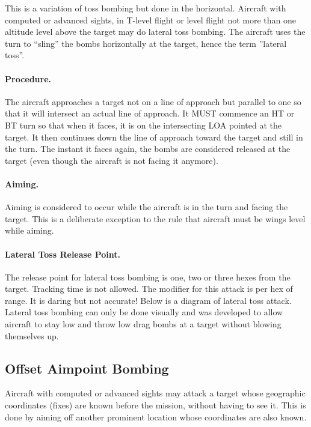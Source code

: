 \begin{advancedrules}
This is a variation of toss bombing but done in the horizontal. Aircraft with computed or advanced sights, in T-level flight or level flight not more than one altitude level above the target may do lateral toss bombing. The aircraft uses the turn to “sling” the bombs horizontally at the target, hence the term ”lateral toss”.                              

\paragraph{Procedure.} The aircraft approaches a target not on a line of approach but parallel to one so that it will intersect an actual line of approach. It MUST commence an HT or BT turn so that when it faces, it is on the intersecting LOA pointed at the target. It then continues down the line of approach toward the target and still in the turn. The instant it faces again, the bombs are considered released at the target (even though the aircraft is not facing it anymore).

\paragraph{Aiming.} Aiming is considered to occur while the aircraft is in the turn and facing the target. This is a deliberate exception to the rule that aircraft must be wings level while aiming.

\paragraph{Lateral Toss Release Point.} The release point for lateral toss bombing is one, two or three hexes from the target. Tracking time is not allowed. The modifier for this attack is  per hex of range. It is daring but not accurate! Below is a diagram of lateral toss attack. Lateral toss bombing can only be done visually and was developed to allow aircraft to stay low and throw low drag bombs at a target without blowing themselves up.



\subsection{Offset Aimpoint Bombing}

Aircraft with computed or advanced sights may attack a target whose geographic coordinates (fixes) are known before the mission, without having to see it. This is done by aiming off another prominent location whose coordinates are also known.


\end{advancedrules}

